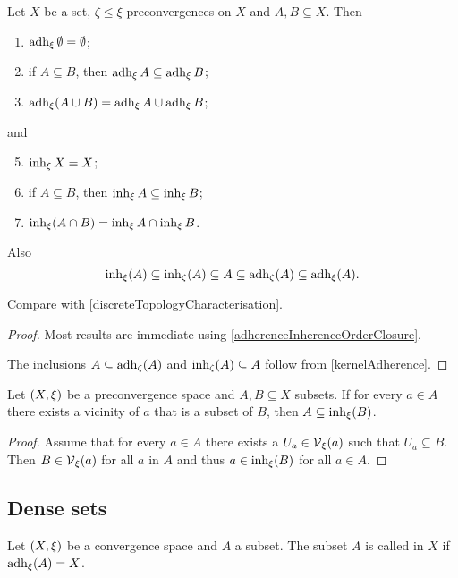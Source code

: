 \begin{corollary} \label{principalInherenceAdherenceProperties}
Let $X$ be a set, $\zeta\leq \xi$ preconvergences on $X$ and $A,B \subseteq X$. Then
\begin{enumerate}
\item $\operatorname{adh}_\xi \emptyset = \emptyset$;
\item if $A \subseteq B$, then $\operatorname{adh}_\xi A \subseteq \operatorname{adh}_\xi B$;
\item $\operatorname{adh}_\xi(A\cup B) = \operatorname{adh}_\xi A \cup \operatorname{adh}_\xi B$;
\end{enumerate}
and
\begin{enumerate} \setcounter{enumi}{4}
\item $\operatorname{inh}_\xi X = X$;
\item if $A \subseteq B$, then $\operatorname{inh}_\xi A \subseteq \operatorname{inh}_\xi B$;
\item $\operatorname{inh}_\xi(A\cap B) = \operatorname{inh}_\xi A \cap \operatorname{inh}_\xi B$.
\end{enumerate}
Also
\[ \operatorname{inh}_\xi(A) \subseteq \operatorname{inh}_\zeta(A) \subseteq A \subseteq \operatorname{adh}_\zeta(A) \subseteq \operatorname{adh}_\xi(A). \]
\end{corollary}
Compare with \ref{discreteTopologyCharacterisation}.
\begin{proof}
Most results are immediate using \ref{adherenceInherenceOrderClosure}.

The inclusions $A \subseteq \operatorname{adh}_\zeta(A)$ and $\operatorname{inh}_\zeta(A) \subseteq A$ follow from \ref{kernelAdherence}.
\end{proof}


\begin{lemma} \label{subsetWithVicinitiesInInherence}
Let $\left( X,\xi \right)$ be a preconvergence space and $A,B\subseteq X$ subsets. If for every $a\in A$ there exists a vicinity of $a$ that is a subset of $B$, then $A\subseteq \operatorname{inh}_\xi(B)$.
\end{lemma}
\begin{proof}
Assume that for every $a\in A$ there exists a $U_a \in \operatorname{\mathcal{V}}_\xi(a)$ such that $U_a \subseteq B$. Then $B\in \operatorname{\mathcal{V}}_\xi(a)$ for all $a$ in $A$ and thus $a\in \operatorname{inh}_\xi(B)$ for all $a\in A$.
\end{proof}


\subsection{Dense sets}
\begin{definition}
Let $\left( X, \xi \right)$ be a convergence space and $A$ a subset. The subset $A$ is called  in $X$ if $\operatorname{adh}_\xi(A) = X$.
\end{definition}

